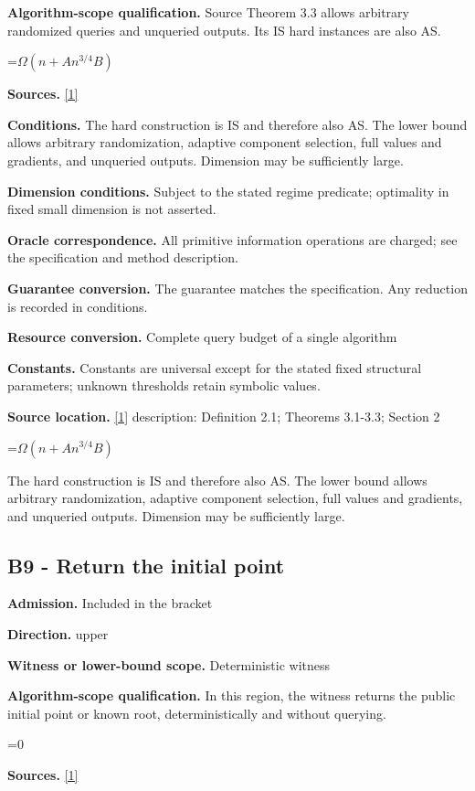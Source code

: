 \documentclass[10pt,a4paper]{article}
\newcommand{\AtlasMath}[1]{\par\begingroup\centering\setbox0=\hbox{$\displaystyle #1$}\ifdim\wd0>1.4\linewidth\typeout{ATLAS WIDE FORMULA: \the\wd0}\fi\ifdim\wd0>\linewidth\resizebox{\linewidth}{!}{\box0}\else\box0\fi\par\endgroup}
\begin{document}
\textbf{Algorithm-scope qualification.} Source Theorem 3.3 allows arbitrary randomized queries and unqueried outputs. Its IS hard instances are also AS.

\AtlasMath{\Omega(n+An^{3/4}B)}
\textbf{Sources.} \href{https://arxiv.org/pdf/2610.16991v2}{[1]}

\textbf{Conditions.} The hard construction is IS and therefore also AS. The lower bound allows arbitrary randomization, adaptive component selection, full values and gradients, and unqueried outputs. Dimension may be sufficiently large.

\textbf{Dimension conditions.} Subject to the stated regime predicate; optimality in fixed small dimension is not asserted.

\textbf{Oracle correspondence.} All primitive information operations are charged; see the specification and method description.

\textbf{Guarantee conversion.} The guarantee matches the specification. Any reduction is recorded in conditions.

\textbf{Resource conversion.} Complete query budget of a single algorithm

\textbf{Constants.} Constants are universal except for the stated fixed structural parameters; unknown thresholds retain symbolic values.

\textbf{Source location.} \href{https://arxiv.org/pdf/2610.16991v2}{[1]} description: Definition 2.1; Theorems 3.1-3.3; Section 2

\AtlasMath{\Omega(n+An^{3/4}B)}
The hard construction is IS and therefore also AS. The lower bound allows arbitrary randomization, adaptive component selection, full values and gradients, and unqueried outputs. Dimension may be sufficiently large.

\subsection{B9 - Return the initial point}
\textbf{Admission.} Included in the bracket

\textbf{Direction.} upper

\textbf{Witness or lower-bound scope.} Deterministic witness

\textbf{Algorithm-scope qualification.} In this region, the witness returns the public initial point or known root, deterministically and without querying.

\AtlasMath{0}
\textbf{Sources.} \href{https://arxiv.org/pdf/2610.16991v2}{[1]}
\end{document}

